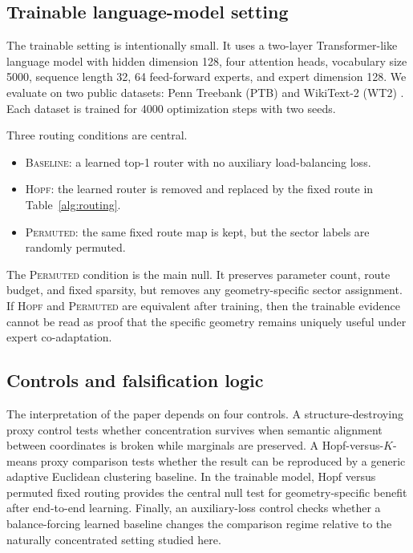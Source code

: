 \documentclass[10pt,letterpaper]{article}
\begin{document}
\subsection{Trainable language-model setting}
The trainable setting is intentionally small. It uses a two-layer Transformer-like language model with hidden dimension 128, four attention heads, vocabulary size 5000, sequence length 32, 64 feed-forward experts, and expert dimension 128. We evaluate on two public datasets: Penn Treebank (PTB) \citep{ptb1993} and WikiText-2 (WT2) \citep{merity2016wt2}. Each dataset is trained for 4000 optimization steps with two seeds.

Three routing conditions are central.
\begin{itemize}
\item \textsc{Baseline}: a learned top-1 router with no auxiliary load-balancing loss.
\item \textsc{Hopf}: the learned router is removed and replaced by the fixed route in Table~\ref{alg:routing}.
\item \textsc{Permuted}: the same fixed route map is kept, but the sector labels are randomly permuted.
\end{itemize}

The \textsc{Permuted} condition is the main null. It preserves parameter count, route budget, and fixed sparsity, but removes any geometry-specific sector assignment. If \textsc{Hopf} and \textsc{Permuted} are equivalent after training, then the trainable evidence cannot be read as proof that the specific geometry remains uniquely useful under expert co-adaptation.

\subsection{Controls and falsification logic}
The interpretation of the paper depends on four controls. A structure-destroying proxy control tests whether concentration survives when semantic alignment between coordinates is broken while marginals are preserved. A Hopf-versus-$K$-means proxy comparison tests whether the result can be reproduced by a generic adaptive Euclidean clustering baseline. In the trainable model, Hopf versus permuted fixed routing provides the central null test for geometry-specific benefit after end-to-end learning. Finally, an auxiliary-loss control checks whether a balance-forcing learned baseline changes the comparison regime relative to the naturally concentrated setting studied here.
\end{document}
